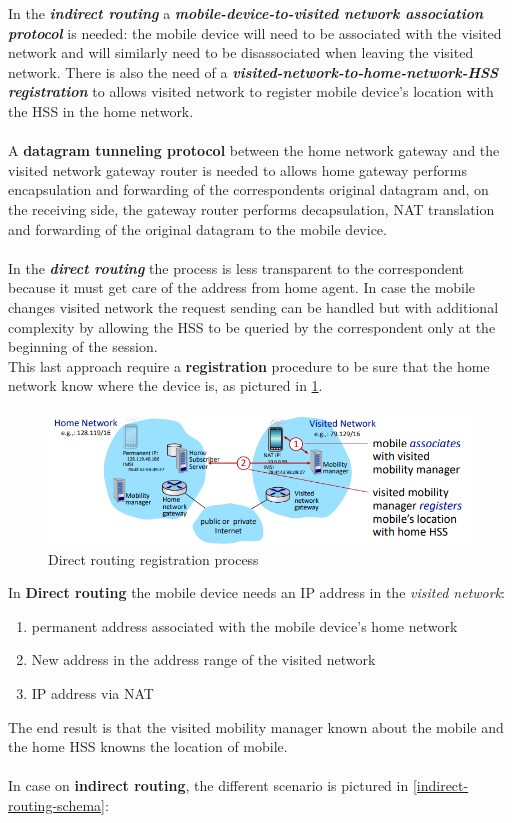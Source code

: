 \documentclass[10pt,a4paper]{report}
\theoremstyle{definition}
\begin{document}
In the \textit{\textbf{indirect routing}} a \textbf{\textit{mobile-device-to-visited network association protocol}} is needed: the mobile device will need to be associated with the visited network and will similarly need to be disassociated when leaving the visited network. There is also the need of a \textit{\textbf{visited-network-to-home-network-HSS registration}} to allows visited network to register mobile device's location with the HSS in the home network.\\\\
A \textbf{datagram tunneling protocol} between the home network gateway and the visited network gateway router is needed to allows home gateway performs encapsulation and forwarding of the correspondents original datagram and, on the receiving side, the gateway router performs decapsulation, NAT translation and forwarding of the original datagram to the mobile device.\\\\
In the \textit{\textbf{direct routing}} the process is less transparent to the correspondent because it must get care of the address from home agent. In case the mobile changes visited network the request sending can be handled but with additional complexity by allowing the HSS to be queried by the correspondent only at the beginning of the session.\\
This last approach require a \textbf{registration} procedure to be sure that the home network know where the device is, as pictured in \ref{registration-proc}.
\begin{figure}[h]
	\centering\includegraphics[scale=0.50]{images/Pasted image 20230322114404.png}
	\caption{Direct routing registration process}
	\label{registration-proc}
\end{figure}

In \textbf{Direct routing} the mobile device needs an IP address in the \textit{visited network}:
\begin{enumerate}
	\item 
	permanent address associated with the mobile device's home network
	\item 
	New address in the address range of the visited network
	\item 
	IP address via NAT
	
\end{enumerate}
The end result is that the visited mobility manager known about the mobile and the home HSS knowns the location of mobile.\\\\
In case on \textbf{indirect routing}, the different scenario is pictured in \ref{indirect-routing-schema}:
\end{document}
